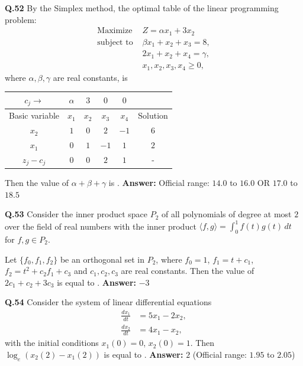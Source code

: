 \documentclass[11pt,a4paper]{article}
\newcommand{\ans}[1]{\textbf{Answer:} #1\par\medskip}
\begin{document}
\textbf{Q.52} By the Simplex method, the optimal table of the linear programming problem:
\begin{align*}
  \text{Maximize } & Z = \alpha x_1 + 3x_2 \\
  \text{subject to } & \beta x_1 + x_2 + x_3 = 8, \\
                     & 2x_1 + x_2 + x_4 = \gamma, \\
                     & x_1, x_2, x_3, x_4 \ge 0,
\end{align*}
where $\alpha, \beta, \gamma$ are real constants, is
\begin{center}
\begin{tabular}{c|cccc|c}
\toprule
$c_j \to$ & $\alpha$ & $3$ & $0$ & $0$ & \\
\midrule
Basic variable & $x_1$ & $x_2$ & $x_3$ & $x_4$ & Solution \\
\midrule
$x_2$ & $1$ & $0$ & $2$ & $-1$ & $6$ \\
$x_1$ & $0$ & $1$ & $-1$ & $1$ & $2$ \\
\midrule
$z_j - c_j$ & $0$ & $0$ & $2$ & $1$ & - \\
\bottomrule
\end{tabular}
\end{center}
Then the value of $\alpha + \beta + \gamma$ is \underline{\hspace{2cm}}.
\ans{Official range: $14.0$ to $16.0$ OR $17.0$ to $18.5$}

\textbf{Q.53} Consider the inner product space $P_2$ of all polynomials of degree at most $2$ over the field of real numbers with the inner product $\langle f, g \rangle = \displaystyle\int_0^1 f(t) g(t)\,dt$ for $f, g \in P_2$.

Let $\{f_0, f_1, f_2\}$ be an orthogonal set in $P_2$, where $f_0 = 1$, $f_1 = t + c_1$, $f_2 = t^2 + c_2 f_1 + c_3$ and $c_1, c_2, c_3$ are real constants. Then the value of $2c_1 + c_2 + 3c_3$ is equal to \underline{\hspace{2cm}}.
\ans{$-3$}

\textbf{Q.54} Consider the system of linear differential equations
\begin{align*}
  \frac{dx_1}{dt} &= 5x_1 - 2x_2, \\
  \frac{dx_2}{dt} &= 4x_1 - x_2,
\end{align*}
with the initial conditions $x_1(0) = 0$, $x_2(0) = 1$. Then $\log_e(x_2(2) - x_1(2))$ is equal to \underline{\hspace{2cm}}.
\ans{$2$ (Official range: $1.95$ to $2.05$)}
\end{document}
